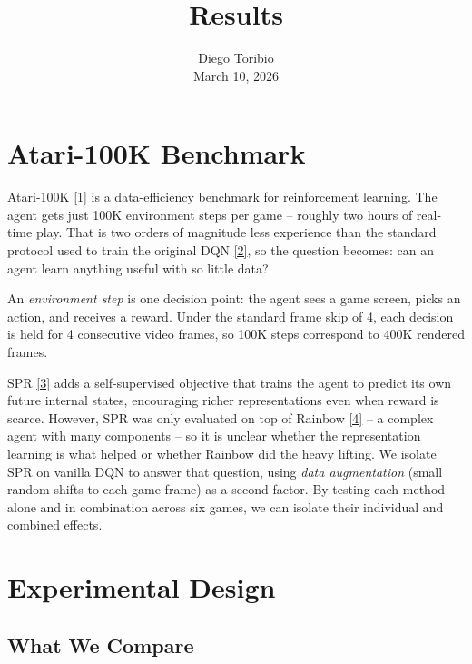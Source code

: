 \documentclass[11pt]{article}
\title{Results}
\author{Diego Toribio\\[0.3em]{\normalsize March 10, 2026}}
\date{\vspace{-2.5em}}
\newcommand{\citelink}[2]{\href{#1}{\small[#2]}}
\begin{document}
\maketitle
\thispagestyle{empty}


\section{Atari-100K Benchmark}

Atari-100K \citelink{https://arxiv.org/abs/1903.00374}{1} is a
data-efficiency benchmark for reinforcement learning. The agent gets
just 100K environment steps per game -- roughly two hours of real-time
play. That is two orders of magnitude less experience than the standard
protocol used to train the original DQN
\citelink{https://www.nature.com/articles/nature14236}{2}, so the
question becomes: can an agent learn anything useful with so little
data?

\medskip
An \textit{environment step} is one decision point: the agent sees a
game screen, picks an action, and receives a reward. Under the standard
frame skip of 4, each decision is held for 4 consecutive video frames,
so 100K steps correspond to 400K rendered frames.

\medskip
SPR \citelink{https://arxiv.org/abs/2007.05929}{3} adds a
self-supervised objective that trains the agent to predict its own
future internal states, encouraging richer representations even when
reward is scarce. However, SPR was only evaluated on top of Rainbow
\citelink{https://arxiv.org/abs/1710.02298}{4} -- a complex agent with
many components -- so it is unclear whether the representation learning
is what helped or whether Rainbow did the heavy lifting. We isolate SPR
on vanilla DQN to answer that question, using \textit{data
augmentation} (small random shifts to each game frame) as a second
factor. By testing each method alone and in combination across six
games, we can isolate their individual and combined effects.

\section{Experimental Design}

\subsection{What We Compare}
\end{document}
